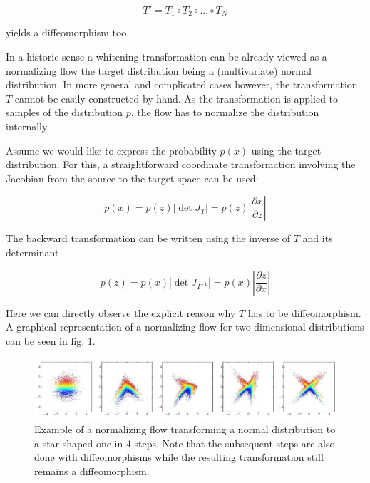 \begin{equation*}
	T' = T_1 \circ T_2 \circ ... \circ T_N
\end{equation*}

yields a diffeomorphism too.

In a historic sense a whitening transformation can be already viewed as a normalizing flow the target distribution being a (multivariate) normal distribution. In more general and complicated cases however, the transformation $T$ cannot be easily constructed by hand. As the transformation is applied to samples of the distribution $p$, the flow has to normalize the distribution internally.

Assume we would like to express the probability $p(x)$ using the target distribution. For this, a straightforward coordinate transformation involving the Jacobian from the source to the target space can be used:

\begin{equation*}
	p(x) = p(z) \left| \det J_T \right| = p(z) \left| \frac{\partial x}{\partial z} \right|
\end{equation*}

The backward transformation can be written using the inverse of $T$ and its determinant

\begin{equation*}
	p(z) = p(x) \left| \det J_{T^{-1}} \right| = p(x) \left| \frac{\partial z}{\partial x} \right|
\end{equation*}

Here we can directly observe the explicit reason why $T$ has to be diffeomorphism. A graphical representation of a normalizing flow for two-dimensional distributions can be seen in fig. \ref{fig:NF_example}.

\begin{figure}[h!]
	\centering
	\includegraphics[width=\textwidth]{figures/neural_networks/flow}
	\caption{Example of a normalizing flow transforming a normal distribution to a star-shaped one in 4 steps. Note that the subsequent steps are also done with diffeomorphisms while the resulting transformation still remains a diffeomorphism. \cite{Papamakarios_NF}}
	\label{fig:NF_example}
\end{figure}

